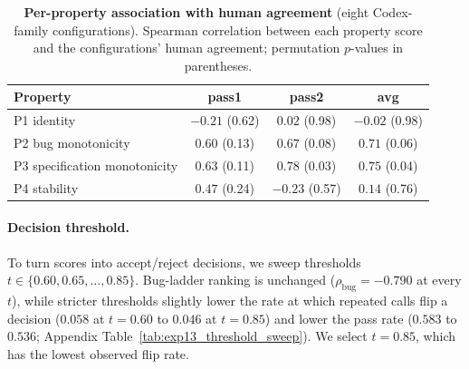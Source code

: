 \begin{table}[t]
  \centering
  \small
  \begin{tabular}{lccc}
    \toprule
    \textbf{Property}                    & \textbf{pass1}          & \textbf{pass2}          & \textbf{avg}            \\
    \midrule
    P1 identity                          & \(-0.21\) (0.62)        & \(0.02\) (0.98)         & \(-0.02\) (0.98)        \\
    P2 bug monotonicity                  & \(0.60\) (0.13)         & \(0.67\) (0.08)         & \(0.71\) (0.06)         \\
    P3 specification monotonicity        & \(\mathbf{0.63}\) (0.11) & \(\mathbf{0.78}\) (0.03) & \(\mathbf{0.75}\) (0.04) \\
    P4 stability                         & \(0.47\) (0.24)         & \(-0.23\) (0.57)        & \(0.14\) (0.76)         \\
    \bottomrule
  \end{tabular}
  \caption{\textbf{Per-property association with human agreement} (eight Codex-family configurations).
  Spearman correlation between each property score and the configurations' human agreement; permutation \(p\)-values in parentheses.}
  \label{tab:property_assoc}
\end{table}

\paragraph{Decision threshold.}
To turn scores into accept/reject decisions, we sweep thresholds \(t\in\{0.60,0.65,\dots,0.85\}\).
Bug-ladder ranking is unchanged (\(\rho_{\text{bug}}=-0.790\) at every \(t\)), while stricter thresholds slightly lower the rate at which repeated calls flip a decision (\(0.058\) at \(t=0.60\) to \(0.046\) at \(t=0.85\)) and lower the pass rate (\(0.583\) to \(0.536\); Appendix Table~\ref{tab:exp13_threshold_sweep}).
We select \(t=0.85\), which has the lowest observed flip rate.

